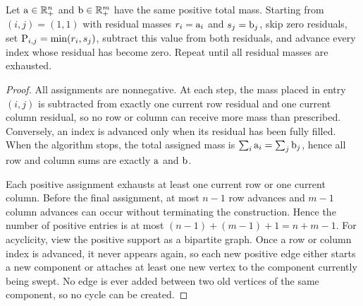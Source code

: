 \begin{prop}\label{prop-northwest-corner}
Let $\a\in\RR_+^n$ and $\b\in\RR_+^m$ have the same positive total mass. Starting from $(i,j)=(1,1)$ with residual masses $r_i=\a_i$ and $s_j=\b_j$, skip zero residuals, set $\P_{i,j}=\min(r_i,s_j)$,
subtract this value from both residuals, and advance every index whose residual has become zero. Repeat until all residual masses are exhausted.
\end{prop}
\begin{proof}
All assignments are nonnegative. At each step, the mass placed in entry $(i,j)$ is subtracted from exactly one current row residual and one current column residual, so no row or column can receive more mass than prescribed. Conversely, an index is advanced only when its residual has been fully filled. When the algorithm stops, the total assigned mass is $\sum_i \a_i=\sum_j \b_j$, hence all row and column sums are exactly $\a$ and $\b$.

Each positive assignment exhausts at least one current row or one current column. Before the final assignment, at most $n-1$ row advances and $m-1$ column advances can occur without terminating the construction. Hence the number of positive entries is at most $(n-1)+(m-1)+1=n+m-1$. For acyclicity, view the positive support as a bipartite graph. Once a row or column index is advanced, it never appears again, so each new positive edge either starts a new component or attaches at least one new vertex to the component currently being swept. No edge is ever added between two old vertices of the same component, so no cycle can be created.
\end{proof}
